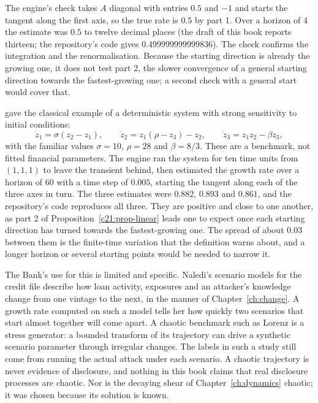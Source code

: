 The engine's check takes $A$ diagonal with entries $0.5$ and $-1$ and starts the tangent along the
first axis, so the true rate is $0.5$ by part 1. Over a horizon of 4 the estimate was $0.5$ to twelve
decimal places (the draft of this book reports thirteen; the repository's code gives
$0.499999999999836$). The check confirms the integration and the renormalisation. Because the
starting direction is already the growing one, it does not test part 2, the slower convergence of
a general starting direction towards the fastest-growing one; a second check with a general start
would cover that.

\citet{lorenz1963} gave the classical example of a deterministic system with strong sensitivity
to initial conditions:
\begin{equation}\label{c21:eq-lorenz}
\dot z_1=\sigma(z_2-z_1),\qquad\dot z_2=z_1(\rho-z_3)-z_2,\qquad\dot z_3=z_1z_2-\beta z_3,
\end{equation}
with the familiar values $\sigma=10$, $\rho=28$ and $\beta=8/3$. These are a benchmark, not fitted
financial parameters. The engine ran the system for ten time units from $(1,1,1)$ to leave the
transient behind, then estimated the growth rate over a horizon of 60 with a time step of $0.005$,
starting the tangent along each of the three axes in turn. The three estimates were $0.882$,
$0.893$ and $0.861$, and the repository's code reproduces all three. They are positive and close to
one another, as part 2 of Proposition~\ref{c21:prop-linear} leads one to expect once each starting
direction has turned towards the fastest-growing one. The spread of about $0.03$ between them is
the finite-time variation that the definition warns about, and a longer horizon or several
starting points would be needed to narrow it.

The Bank's use for this is limited and specific. Naledi's scenario models for the credit file
describe how loan activity, exposures and an attacker's knowledge change from one vintage to the
next, in the manner of Chapter~\ref{ch:change}. A growth rate computed on such a model tells her
how quickly two scenarios that start almost together will come apart. A chaotic benchmark such as
Lorenz is a stress generator: a bounded transform of its trajectory can drive a synthetic
scenario parameter through irregular changes. The labels in such a study still come from running
the actual attack under each scenario. A chaotic trajectory is never evidence of disclosure, and
nothing in this book claims that real disclosure processes are chaotic. Nor is the decaying shear
of Chapter~\ref{ch:dynamics} chaotic; it was chosen because its solution is known.

